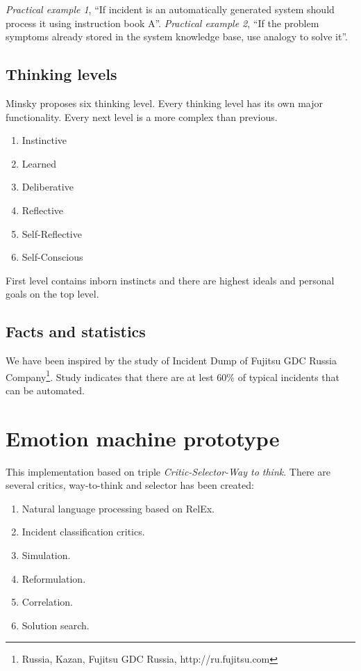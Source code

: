 \documentclass[runningheads,a4paper]{llncs}
\begin{document}
\begin{enumerate}
\emph{Practical example 1}, “If incident is an automatically generated system should process it using instruction book A”.
\emph{Practical example 2}, “If the problem symptoms already stored in the system knowledge base, use analogy to solve it”. 

\subsection{Thinking levels}

Minsky proposes six thinking level. Every thinking level has its own major functionality. Every next level is a more complex than previous.

\begin{enumerate}
 \item Instinctive
 \item Learned
 \item Deliberative
 \item Reflective
 \item Self-Reflective
 \item Self-Conscious
\end{enumerate}

First level contains inborn instincts and there are highest ideals and personal goals on the top level.

\subsection{Facts and statistics}
We have been inspired by the study of Incident Dump of Fujitsu GDC Russia Company\footnote{Russia, Kazan, Fujitsu GDC Russia, http://ru.fujitsu.com}. Study indicates that there are at lest 60\% of typical incidents that can be automated.

\section{Emotion machine prototype}
This implementation based on triple \emph{Critic-Selector-Way to think}. There are several critics, way-to-think and selector has been created:

\begin{enumerate}
 \item Natural language processing based on RelEx.
 \item Incident classification critics.
 \item Simulation.
 \item Reformulation.
 \item Correlation.
 \item Solution search.
\end{enumerate}


\end{enumerate}
\end{document}
